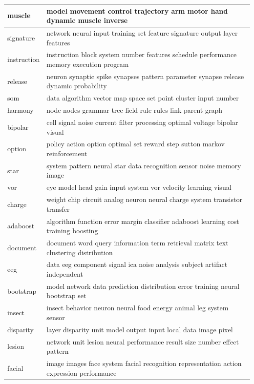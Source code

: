 \documentclass{article}
\begin{document}
\begin{tabular}{ l | l }
    muscle & model movement control trajectory arm motor hand dynamic muscle inverse \\ \hline 
    signature & network neural input training set feature signature output layer features \\ \hline 
    instruction & instruction block system number features schedule performance memory execution program \\ \hline 
    release & neuron synaptic spike synapses pattern parameter synapse release dynamic probability \\ \hline 
    som & data algorithm vector map space set point cluster input number \\ \hline 
    harmony & node nodes grammar tree field rule rules link parent graph \\ \hline 
    bipolar & cell signal noise current filter processing optimal voltage bipolar visual \\ \hline 
    option & policy action option optimal set reward step sutton markov reinforcement \\ \hline 
    star & system pattern neural star data recognition sensor noise memory image \\ \hline 
    vor & eye model head gain input system vor velocity learning visual \\ \hline 
    charge & weight chip circuit analog neuron neural charge system transistor transfer \\ \hline 
    adaboost & algorithm function error margin classifier adaboost learning cost training boosting \\ \hline 
    document & document word query information term retrieval matrix text clustering distribution \\ \hline 
    eeg & data eeg component signal ica noise analysis subject artifact independent \\ \hline 
    bootstrap & model network data prediction distribution error training neural bootstrap set \\ \hline 
    insect & insect behavior neuron neural food energy animal leg system sensor \\ \hline 
    disparity & layer disparity unit model output input local data image pixel \\ \hline 
    lesion & network unit lesion neural performance result size number effect pattern \\ \hline 
    facial & image images face system facial recognition representation action expression performance \\ \hline 

\end{tabular}
\end{document}
